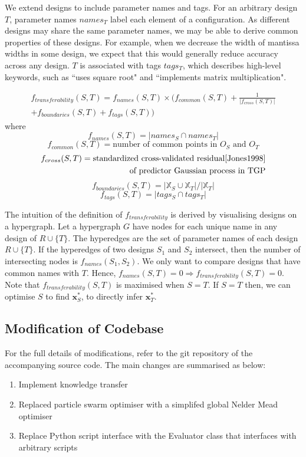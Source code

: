 \documentclass[10pt,a4paper]{article}
\begin{document}
We extend designs to include parameter names and tags. For an arbitrary design $T$, parameter names $names_T$ label each element of a configuration. As different designs may share the same parameter names, we may be able to derive common properties of these designs. For example, when we decrease the width of mantissa widths in some design, we expect that this would generally reduce accuracy across any design. $T$ is associated with tags $tags_T$, which describes high-level keywords, such as ``uses square root" and ``implements matrix multiplication".

\[
	\begin{split}
		f_{transferability}(S,T)=f_{names}(S,T)\times(f_{common}(S,T)+\frac{1}{|f_{cross}(S,T)|}\\
			+f_{boundaries}(S,T)+f_{tags}(S,T))
	\end{split}
\] where
\[f_{names}(S,T)=|names_S\cap names_T|\]
\[f_{common}(S,T)=\text{number of common points in $O_S$ and $O_T$}\]
\[
	\begin{split}
		f_{cross}(S,T)=\text{standardized cross-validated residual\cite{Jones1998}}\\
			\text{of predictor Gaussian process in TGP}
	\end{split}
\]
\[f_{boundaries}(S,T)=|\mathbb{X}_S\cup\mathbb{X}_T|/|\mathbb{X}_T|\]
\[f_{tags}(S,T)=|tags_S\cap tags_T|\]

The intuition of the definition of $f_{transferability}$ is derived by visualising designs on a hypergraph. Let a hypergraph $G$ have nodes for each unique name in any design of $R\cup\{T\}$. The hyperedges are the set of parameter names of each design $R\cup\{T\}$. If the hyperedges of two designs $S_1$ and $S_2$ intersect, then the number of intersecting nodes is $f_{names}(S_1,S_2)$. We only want to compare designs that have common names with $T$. Hence, $f_{names}(S,T)=0\Rightarrow f_{transferability}(S,T)=0$. Note that $f_{transferability}(S,T)$ is maximised when $S=T$. If $S=T$ then, we can optimise $S$ to find $\mathbf{x}_S^*$, to directly infer $\mathbf{x}_T^*$.

\subsection{Modification of Codebase}

For the full details of modifications, refer to the git repository of the accompanying source code. The main changes are summarised as below:
\begin{enumerate}
	\item Implement knowledge transfer
	\item Replaced particle swarm optimiser with a simplifed global Nelder Mead optimiser\cite{Luersen2004}
	\item Replace Python script interface with the Evaluator class that interfaces with arbitrary scripts
\end{enumerate}
\end{document}
